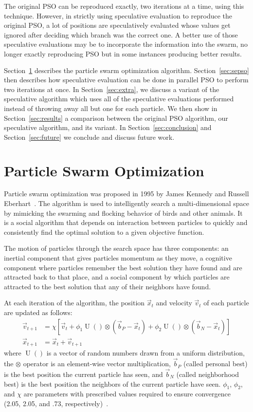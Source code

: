 \documentclass[letterpaper]{sig-alt-release2}
\renewcommand{\sec}[1]{Section~\ref{sec:#1}}
\DeclareMathOperator{\URand}{U}
\providecommand{\ppos}{\ensuremath{\Vec{x}}}
\providecommand{\pvel}{\ensuremath{\Vec{v}}}
\providecommand{\nbest}{\ensuremath{\Vec{b}_N}}
\providecommand{\pbest}{\ensuremath{\Vec{b}_P}}
\providecommand{\constriction}{\ensuremath{\chi}}
\providecommand{\coeff}{\ensuremath{\phi}}
\begin{document}
The original PSO can be reproduced exactly, two iterations at a time, using
this technique.  However, in strictly using speculative evaluation to reproduce
the original PSO, a lot of positions are speculatively evaluated whose values
get ignored after deciding which branch was the correct one.  A better use of
those speculative evaluations may be to incorporate the information into the
swarm, no longer exactly reproducing PSO but in some instances producing better
results.

\sec{pso} describes the particle swarm optimization algorithm.  \sec{sepso}
then describes how speculative evaluation can be done in parallel PSO to
perform two iterations at once.  In \sec{extra}, we discuss a variant of the
speculative algorithm which uses all of the speculative evaluations performed
instead of throwing away all but one for each particle.  We then show in
\sec{results} a comparison between the original PSO algorithm, our speculative
algorithm, and its variant.  In \sec{conclusion} and \sec{future} we conclude
and discuss future work.

\section{Particle Swarm Optimization}
\label{sec:pso}

Particle swarm optimization was proposed in 1995 by James Kennedy and Russell
Eberhart~\cite{kennedy-icnn95}.  The algorithm is used to intelligently search
a multi-dimensional space by mimicking the swarming and flocking behavior of
birds and other animals. It is a social algorithm that depends on interaction
between particles to quickly and consistently find the optimal solution to a
given objective function.

The motion of particles through the search space has three components: an
inertial component that gives particles momentum as they move, a cognitive
component where particles remember the best solution they have found and are
attracted back to that place, and a social component by which particles are
attracted to the best solution that any of their neighbors have found.

At each iteration of the algorithm, the position $\ppos_t$ and velocity
$\pvel_t$ of each particle are updated as follows:
\begin{align}
\label{eq:velupdate}
	\pvel_{t+1} &=
		\constriction \left[ \pvel_t +
			\coeff_1\URand()\otimes(\pbest - \ppos_t) +
			\coeff_2\URand()\otimes(\nbest - \ppos_t)
		\right] \\
\label{eq:posupdate}
	\ppos_{t+1} &= \ppos_t + \pvel_{t+1}
\end{align}
where \( \URand() \) is a vector of random numbers drawn from a uniform
distribution, the \( \otimes \) operator is an element-wise vector
multiplication, $\pbest$ (called personal best) is the best position the
current particle has seen, and $\nbest$ (called neighborhood best) is the best
position the neighbors of the current particle have seen.  \( \coeff_1 \), \(
\coeff_2 \), and \( \constriction \) are parameters with prescribed values
required to ensure convergence (2.05, 2.05, and .73,
respectively)~\cite{clerc-tec02}.
\end{document}
